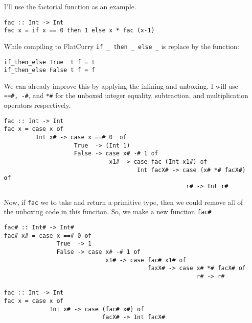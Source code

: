 \documentclass{article}
\begin{document}
I'll use the factorial function as an example.
\begin{verbatim}
fac :: Int -> Int
fac x = if x == 0 then 1 else x * fac (x-1)
\end{verbatim}

While compiling to FlatCurry \texttt{if \_ then \_ else \_} is replace by the function:
\begin{verbatim}
if_then_else True  t f = t
if_then_else False t f = f
\end{verbatim}

We can already improve this by applying the inlining and unboxing.
I will use \texttt{==\#, -\#}, and \texttt{*\#} for the unboxed
integer equality, subtraction, and multiplication operators respectively.
\begin{verbatim}
fac :: Int -> Int
fac x = case x of
         Int x# -> case x ==# 0  of
                    True  -> (Int 1) 
                    False -> case x# -# 1 of
                              x1# -> case fac (Int x1#) of
                                      Int facX# -> case (x# *# facX#) of
                                                    r# -> Int r#
\end{verbatim}
Now, if \texttt{fac} we to take and return a primitive type, then
we could remove all of the unboxing code in this funciton.
So, we make a new function \texttt{fac\#}
\begin{verbatim}
fac# :: Int# -> Int#
fac# x# = case x ==# 0 of
               True  -> 1 
               False -> case x# -# 1 of
                             x1# -> case fac# x1# of
                                         faxX# -> case x# *# facX# of
                                                       r# -> r#

fac :: Int -> Int
fac x = case x of 
             Int x# -> case (fac# x#) of
                            facX# -> Int facX#
\end{verbatim}
\end{document}
